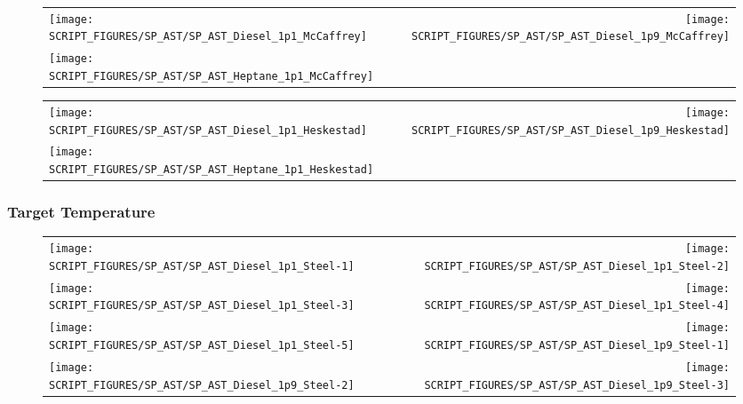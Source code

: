 \begin{figure}[!ht]
\begin{tabular*}{\textwidth}{l@{\extracolsep{\fill}}r}
\texttt{[image: SCRIPT\_FIGURES/SP\_AST/SP\_AST\_Diesel\_1p1\_McCaffrey]} &
\texttt{[image: SCRIPT\_FIGURES/SP\_AST/SP\_AST\_Diesel\_1p9\_McCaffrey]} \\
\texttt{[image: SCRIPT\_FIGURES/SP\_AST/SP\_AST\_Heptane\_1p1\_McCaffrey]}
\end{tabular*}
\end{figure}

\begin{figure}[!ht]
\begin{tabular*}{\textwidth}{l@{\extracolsep{\fill}}r}
\texttt{[image: SCRIPT\_FIGURES/SP\_AST/SP\_AST\_Diesel\_1p1\_Heskestad]} &
\texttt{[image: SCRIPT\_FIGURES/SP\_AST/SP\_AST\_Diesel\_1p9\_Heskestad]} \\
\texttt{[image: SCRIPT\_FIGURES/SP\_AST/SP\_AST\_Heptane\_1p1\_Heskestad]}
\end{tabular*}
\end{figure}

\clearpage

\subsubsection{Target Temperature}

\begin{figure}[!ht]
\begin{tabular*}{\textwidth}{l@{\extracolsep{\fill}}r}
\texttt{[image: SCRIPT\_FIGURES/SP\_AST/SP\_AST\_Diesel\_1p1\_Steel-1]} &
\texttt{[image: SCRIPT\_FIGURES/SP\_AST/SP\_AST\_Diesel\_1p1\_Steel-2]} \\
\texttt{[image: SCRIPT\_FIGURES/SP\_AST/SP\_AST\_Diesel\_1p1\_Steel-3]} &
\texttt{[image: SCRIPT\_FIGURES/SP\_AST/SP\_AST\_Diesel\_1p1\_Steel-4]} \\
\texttt{[image: SCRIPT\_FIGURES/SP\_AST/SP\_AST\_Diesel\_1p1\_Steel-5]} &
\texttt{[image: SCRIPT\_FIGURES/SP\_AST/SP\_AST\_Diesel\_1p9\_Steel-1]} \\
\texttt{[image: SCRIPT\_FIGURES/SP\_AST/SP\_AST\_Diesel\_1p9\_Steel-2]} &
\texttt{[image: SCRIPT\_FIGURES/SP\_AST/SP\_AST\_Diesel\_1p9\_Steel-3]}
\end{tabular*}
\end{figure}

